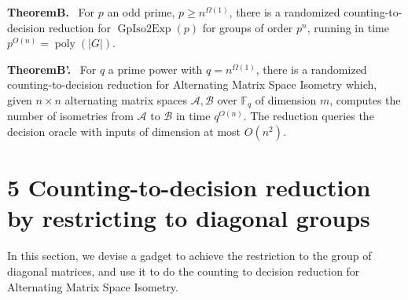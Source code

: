 \documentclass[10pt,a4paper]{article}
\newenvironment{authorclaim}[1]{\par\medskip\noindent\textbf{#1.}\ }{\par\medskip}
\begin{document}
\begin{authorclaim}{TheoremB}
For $p$ an odd prime, $p\ge n^{\Omega(1)}$, there is a randomized counting-to-decision reduction for $\operatorname{GpIso2Exp}(p)$ for groups of order $p^n$, running in time $p^{O(n)}=\operatorname{poly}(|G|)$.
\end{authorclaim}

\begin{authorclaim}{TheoremB'}
For $q$ a prime power with $q=n^{\Omega(1)}$, there is a randomized counting-to-decision reduction for Alternating Matrix Space Isometry which, given $n\times n$ alternating matrix spaces $\mathcal A,\mathcal B$ over $\mathbb F_q$ of dimension $m$, computes the number of isometries from $\mathcal A$ to $\mathcal B$ in time $q^{O(n)}$. The reduction queries the decision oracle with inputs of dimension at most $O(n^2)$.
\end{authorclaim}

\section*{5 Counting-to-decision reduction by restricting to diagonal groups}
In this section, we devise a gadget to achieve the restriction to the group of diagonal matrices, and use it to do the counting to decision reduction for Alternating Matrix Space Isometry.
\end{document}
